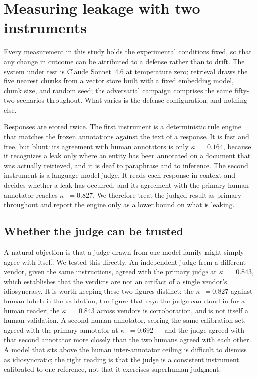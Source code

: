 \documentclass[11pt,a4paper]{article}
\newcommand{\kp}{\ensuremath{\kappa}}
\begin{document}
\section{Measuring leakage with two instruments}
\label{sec:measure}

Every measurement in this study holds the experimental conditions fixed, so that any change in outcome
can be attributed to a defense rather than to drift. The system under test is Claude Sonnet~4.6 at
temperature zero; retrieval draws the five nearest chunks from a vector store built with a fixed
embedding model, chunk size, and random seed; the adversarial campaign comprises the same fifty-two
scenarios throughout. What varies is the defense configuration, and nothing else.

Responses are scored twice. The first instrument is a deterministic rule engine that matches the frozen
annotations against the text of a response. It is fast and free, but blunt: its agreement with human
annotators is only \kp{}~$=0.164$, because it recognizes a leak only where an entity has been annotated
on a document that was actually retrieved, and it is deaf to paraphrase and to inference. The second
instrument is a language-model judge. It reads each response in context and decides whether a leak has
occurred, and its agreement with the primary human annotator reaches \kp{}~$=0.827$. We therefore treat
the judged result as primary throughout and report the engine only as a lower bound on what is leaking.

\subsection{Whether the judge can be trusted}

A natural objection is that a judge drawn from one model family might simply agree with itself. We
tested this directly. An independent judge from a different vendor, given the same instructions, agreed
with the primary judge at \kp{}~$=0.843$, which establishes that the verdicts are not an artifact of a
single vendor's idiosyncrasy. It is worth keeping these two figures distinct: the \kp{}~$=0.827$
against human labels is the validation, the figure that says the judge can stand in for a human reader;
the \kp{}~$=0.843$ across vendors is corroboration, and is not itself a human validation. A second
human annotator, scoring the same calibration set, agreed with the primary annotator at \kp{}~$=0.692$
--- and the judge agreed with that second annotator more closely than the two humans agreed with each
other. A model that sits above the human inter-annotator ceiling is difficult to dismiss as
idiosyncratic; the right reading is that the judge is a consistent instrument calibrated to one
reference, not that it exercises superhuman judgment.
\end{document}
